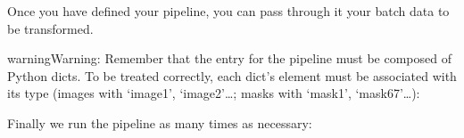 \documentclass[letterpaper,10pt,english]{sphinxmanual}
\begin{document}
Once you have defined your pipeline, you can pass through it your batch data to be transformed.

\begin{sphinxadmonition}{warning}{Warning:}
Remember that the entry for the pipeline must be composed of Python dicts. To be treated correctly, each dict’s element must be associated with its type (images with ‘image1’, ‘image2’…; masks with ‘mask1’, ‘mask67’…):
\end{sphinxadmonition}

\begin{sphinxVerbatim}[commandchars=\\\{\}]
       
       
       

  \PYG{p}{[}  \PYG{p}{]}
\end{sphinxVerbatim}

Finally we run the pipeline as many times as necessary:

\begin{sphinxVerbatim}[commandchars=\\\{\}]
  
\end{sphinxVerbatim}
\end{document}
